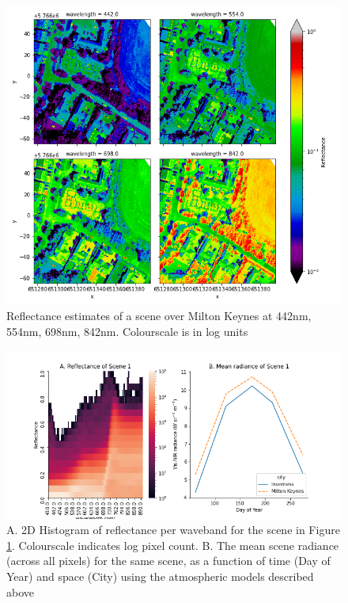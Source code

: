 \documentclass[10pt,a4paper,final,onecolumn]{article}
\begin{document}
\begin{figure}
    \centering
    \includegraphics[width=\textwidth]{TreeView_plots/1_input_reflectance.png}
    \caption{Reflectance estimates of a scene over Milton Keynes at 442nm, 554nm, 698nm, 842nm. Colourscale is in log units}
    \label{fig:reflectances1}
\end{figure}

\begin{figure}
    \centering
    \includegraphics[width=\textwidth]{TreeView_plots/3_integrated_sensor_radiance.png}
    \caption{A. 2D Histogram of reflectance per waveband for the scene in Figure \ref{fig:reflectances1}. Colourscale indicates log pixel count. B. The mean scene radiance (across all pixels) for the same scene, as a function of time (Day of Year) and space (City) using the atmospheric models described above}
    \label{fig:reflectances_hist}
\end{figure}
\end{document}
